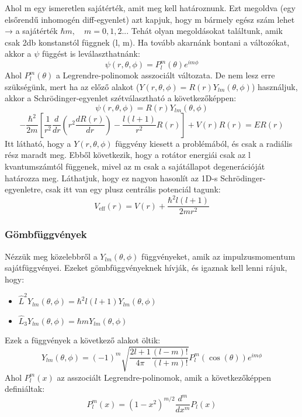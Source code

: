 \documentclass[a4paper,12pt]{article}
\begin{document}
Ahol m egy ismeretlen sajátérték, amit meg kell határoznunk. Ezt megoldva (egy elsőrendű inhomogén diff-egyenlet) azt kapjuk, hogy m
bármely egész szám lehet → a sajátérték $\hbar m, \quad m = 0,1,2...$ Tehát olyan megoldásokat találtunk, amik csak 2db konstanstól függnek (l,
m). Ha tovább akarnánk bontani a változókat, akkor a $\psi$ függést is leválaszthatnánk:
\begin{equation}
    \psi(r, \theta, \phi) = P_l^m (\theta) e^{i m \phi}
\end{equation}
Ahol $P_l^m (\theta)$ a Legrendre-polinomok asszociált változata. De nem lesz erre szükségünk, mert ha az előző alakot ($Y(r, \theta, \phi) = R(r) Y_{lm}(\theta, \phi)$) használjuk,
akkor a Schrödinger-egyenlet szétválasztható a következőképpen:
\begin{equation}
    \psi(r, \theta, \phi) = R(r) Y_{lm}(\theta, \phi)
\end{equation}
\begin{equation}
    - \frac{\hbar^2}{2m} \left[ \frac{1}{r^2} \frac{d}{d r} \left( r^2 \frac{d R(r)}{d r} \right) - \frac{l (l + 1)}{r^2} R(r) \right] + V(r) R(r) = E R(r)
\end{equation}
Itt látható, hogy a $Y(r, \theta, \phi)$ függvény kiesett a problémából, és csak a radiális rész maradt meg. Ebből következik, hogy a rotátor
energiái csak az l kvantumszámtól függenek, mivel az m csak a sajátállapot degenerációját határozza meg. Láthatjuk, hogy
ez nagyon hasonlít az 1D-s Schrödinger-egyenletre, csak itt van egy plusz centrális potenciál tagunk:
\begin{equation}
    V_{\text{eff}}(r) = V(r) + \frac{\hbar^2 l (l + 1)}{2m r^2}
\end{equation}

\subsubsection*{Gömbfüggvények}
Nézzük meg közelebbről a $Y_{lm}(\theta, \phi)$ függvényeket, amik az impulzusmomentum sajátfüggvényei. Ezeket gömbfüggvényeknek hívják,
és igaznak kell lenni rájuk, hogy:
\begin{itemize}
    \item $\hat{L}^2 Y_{lm}(\theta, \phi) = \hbar^2 l (l + 1) Y_{lm}(\theta, \phi)$
    \item $\hat{L}_3 Y_{lm}(\theta, \phi) = \hbar m Y_{lm}(\theta, \phi)$
\end{itemize}
Ezek a függvények a következő alakot öltik:
\begin{equation}
    Y_{lm}(\theta, \phi) = (-1)^m \sqrt{\frac{2l + 1}{4 \pi} \frac{(l - m)!}{(l + m)!}} P_l^m(\cos(\theta)) e^{i m \phi}
\end{equation}
Ahol $P_l^m(x)$ az asszociált Legrendre-polinomok, amik a következőképpen definiáltak:
\begin{equation}
    P_l^m(x) = (1 - x^2)^{m/2} \frac{d^m}{d x^m} P_l(x)
\end{equation}
\end{document}

